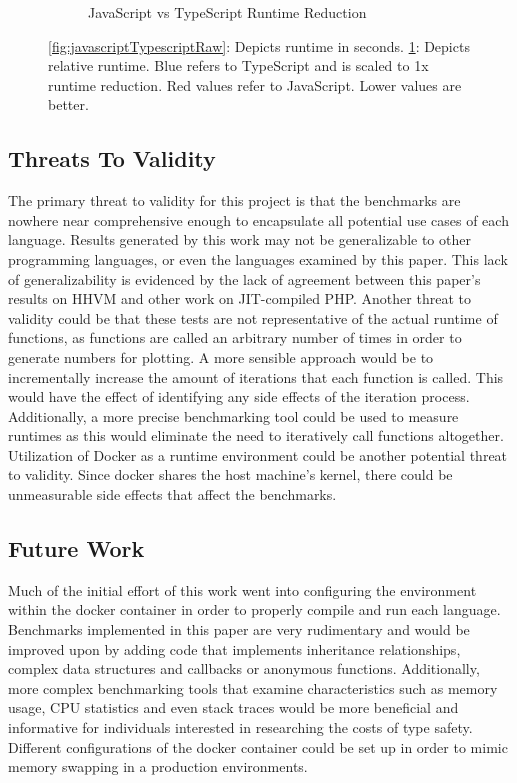 \begin{figure}[H]
\begin{subfigure}{.5\textwidth}
  \caption{JavaScript vs TypeScript Runtime Reduction}
  \label{fig:javascriptTypescriptRelative}
\end{subfigure}
\caption{\ref{fig:javascriptTypescriptRaw}: Depicts runtime in seconds. \ref{fig:javascriptTypescriptRelative}: Depicts relative runtime. Blue refers to TypeScript  and is scaled to 1x runtime reduction. Red values refer to JavaScript. Lower values are better.}
\label{fig:javascriptTypescript}
\end{figure}


\subsection{Threats To Validity}
The primary threat to validity for this project is that the benchmarks are nowhere near comprehensive enough to encapsulate all potential use cases of each language. Results generated by this work may not be generalizable to other programming languages, or even the languages examined by this paper. This lack of generalizability is evidenced by the lack of agreement between this paper's results on HHVM and other work on JIT-compiled PHP.
Another threat to validity could be that these tests are not representative of the actual runtime of functions, as functions are called an arbitrary number of times in order to generate numbers for plotting. A more sensible approach would be to incrementally increase the amount of iterations that each function is called. This would have the effect of identifying any side effects of the iteration process. Additionally, a more precise benchmarking tool could be used to measure runtimes as this would eliminate the need to iteratively call functions altogether.
Utilization of Docker as a runtime environment could be another potential threat to validity. Since docker shares the host machine's kernel, there could be unmeasurable side effects that affect the benchmarks. 

\subsection{Future Work}
Much of the initial effort of this work went into configuring the environment within the docker container in order to properly compile and run each language. Benchmarks implemented in this paper are very rudimentary and would be improved upon by adding code that implements inheritance relationships, complex data structures and callbacks or anonymous functions. Additionally, more complex benchmarking tools that examine characteristics such as memory usage, CPU statistics and even stack traces would be more beneficial and informative for individuals interested in researching the costs of type safety. Different configurations of the docker container could be set up in order to mimic memory swapping in a production environments. 
